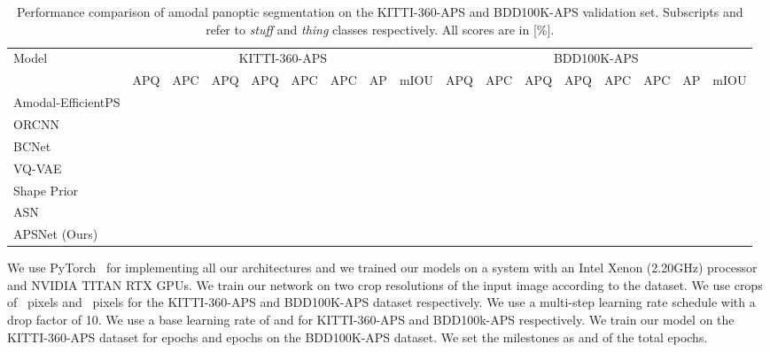 \documentclass[10pt,twocolumn,letterpaper]{article}
\begin{document}
\begin{table*}
\footnotesize 
\centering
\begin{tabular}{p{2.8cm}|p{0.4cm}p{0.4cm}p{0.5cm}p{0.5cm}p{0.5cm}p{0.5cm}p{0.3cm}p{0.6cm}|p{0.4cm}p{0.4cm}p{0.5cm}p{0.5cm}p{0.5cm}p{0.5cm}p{0.3cm}p{0.5cm}}
\toprule
Model &  \multicolumn{8}{c|}{KITTI-360-APS} & \multicolumn{8}{c}{BDD100K-APS}\\
\cmidrule{2-17}
 &  APQ  & APC & APQ &APQ & APC&  APC & AP & mIOU & APQ  & APC & APQ &APQ & APC&  APC & AP & mIOU\\
\midrule
Amodal-EfficientPS &  &  &  &  &  &  &  &  &  &  &  &  &  &  &  &  \\
ORCNN~\cite{follmann2019learning}  &  &  &  &  &  &  &  &  &  &  &  &  &  &  &  &  \\
BCNet~\cite{Ke_2021_CVPR}  &  &  &  &  &  &  &  &  &  &  &  &  &  &  &  &  \\
VQ-VAE~\cite{jang2020learning}  &  &   &  &  &  &  &  &  &  &  &  &  &  &  &  &   \\
Shape Prior~\cite{yuting2021amodal}  &  &   &  &  &  &  &  &  &  &  &  &  &  &  &  &   \\
ASN~\cite{qi2019amodal} &  &  &  &  &  &  &  &  &  &  &  &  &  &  &  &    \\
\midrule
\mbox{APSNet} (Ours)  &   &   &  &   &  &   &  & &  &   &  &   &  &   &  &  \\
\bottomrule
\end{tabular}
\vspace{-0.2cm}
\caption{Performance comparison of amodal panoptic segmentation on the KITTI-360-APS and BDD100K-APS validation set. Subscripts  and  refer to \textit{stuff} and \textit{thing} classes respectively. All scores are in [\%].}
\label{tab:kittiEvaluation}
\vspace{-0.3cm}
\end{table*}

We use PyTorch~\cite{paszke2019pytorch} for implementing all our architectures and we trained our models on a system with an Intel Xenon (2.20GHz) processor and NVIDIA TITAN RTX GPUs. We train our network on two crop resolutions of the input image according to the dataset. We use crops of ~pixels and ~pixels for the KITTI-360-APS and BDD100K-APS dataset respectively. We use a multi-step learning rate schedule with a drop factor of 10. We use a base learning rate of  and  for KITTI-360-APS and BDD100k-APS respectively. We train our model on the KITTI-360-APS dataset for  epochs and  epochs on the BDD100K-APS dataset. We set the milestones as  and  of the total epochs.
\end{document}
